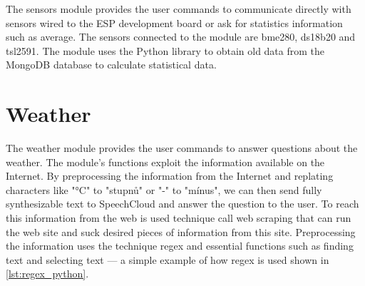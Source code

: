 The sensors module provides the user commands to communicate directly with sensors wired to the ESP development board or ask for statistics information such as average. The sensors connected to the module are bme280, ds18b20 and tsl2591. The module uses the Python library to obtain old data from the MongoDB database to calculate statistical data.

\section{Weather}

The weather module provides the user commands to answer questions about the weather. The module's functions exploit the information available on the Internet. By preprocessing the information from the Internet and replating characters like "°C" to "stupnů" or "-" to "mínus", we can then send fully synthesizable text to SpeechCloud and answer the question to the user. To reach this information from the web is used technique call web scraping that can run the web site and suck desired pieces of information from this site. Preprocessing the information uses the technique regex and essential functions such as finding text and selecting text — a simple example of how regex is used shown in \cref{lst:regex_python}.

% 

